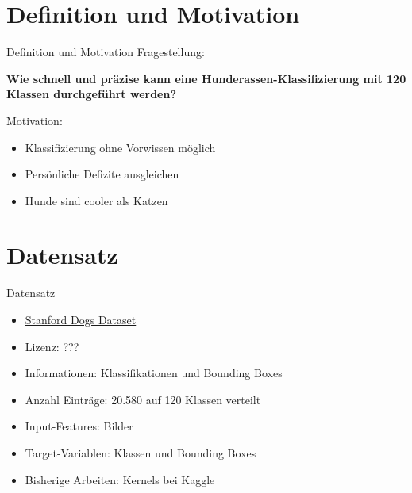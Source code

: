 


\maketitle
  \section{Definition und Motivation}
  \begin{frame}{Definition und Motivation}
    Fragestellung:
    \begin{center}
      \textbf{Wie schnell und präzise kann eine Hunderassen-Klassifizierung mit 120 Klassen
      durchgeführt werden?}
    \end{center}
    Motivation:
    \begin{itemize}
      \item Klassifizierung ohne Vorwissen möglich
      \item Persönliche Defizite ausgleichen
      \item Hunde sind cooler als Katzen
    \end{itemize}
  \end{frame}
  \section{Datensatz}
  \begin{frame}{Datensatz}
    \begin{itemize}
      \item \href{https://www.kaggle.com/jessicali9530/stanford-dogs-dataset}{Stanford Dogs Dataset}
      \item Lizenz: ???
      \item Informationen: Klassifikationen und Bounding Boxes
      \item Anzahl Einträge: 20.580 auf 120 Klassen verteilt
      \item Input-Features: Bilder
      \item Target-Variablen: Klassen und Bounding Boxes
      \item Bisherige Arbeiten: Kernels bei Kaggle
    \end{itemize}
  \end{frame}

